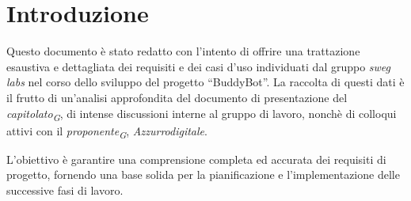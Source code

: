 


\section{Introduzione}
Questo documento è stato redatto con l'intento di offrire una trattazione esaustiva e dettagliata 
dei requisiti e dei casi d'uso individuati dal gruppo \textit{sweg labs} nel corso dello sviluppo
del progetto “BuddyBot”. La raccolta di questi dati è il frutto di un'analisi approfondita
del documento di presentazione del \textit{capitolato\textsubscript{G}}, di intense discussioni interne al gruppo di lavoro, 
nonchè di colloqui attivi con il \textit{proponente\textsubscript{G}}, \textit{Azzurrodigitale}.

L'obiettivo è garantire una comprensione completa ed accurata dei requisiti di progetto,
fornendo una base solida per la pianificazione e l'implementazione delle successive fasi di lavoro.

